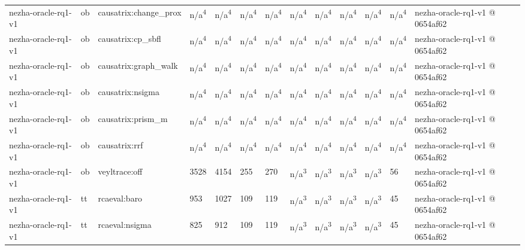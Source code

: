 \begin{table}[t]
\begin{tabular}{lllllllllllll}
nezha-oracle-rq1-v1 & ob & causatrix:change\_prox & n/a\textsuperscript{4} & n/a\textsuperscript{4} & n/a\textsuperscript{4} & n/a\textsuperscript{4} & n/a\textsuperscript{4} & n/a\textsuperscript{4} & n/a\textsuperscript{4} & n/a\textsuperscript{4} & n/a\textsuperscript{4} & nezha-oracle-rq1-v1 @ 0654af62 \\
nezha-oracle-rq1-v1 & ob & causatrix:cp\_sbfl & n/a\textsuperscript{4} & n/a\textsuperscript{4} & n/a\textsuperscript{4} & n/a\textsuperscript{4} & n/a\textsuperscript{4} & n/a\textsuperscript{4} & n/a\textsuperscript{4} & n/a\textsuperscript{4} & n/a\textsuperscript{4} & nezha-oracle-rq1-v1 @ 0654af62 \\
nezha-oracle-rq1-v1 & ob & causatrix:graph\_walk & n/a\textsuperscript{4} & n/a\textsuperscript{4} & n/a\textsuperscript{4} & n/a\textsuperscript{4} & n/a\textsuperscript{4} & n/a\textsuperscript{4} & n/a\textsuperscript{4} & n/a\textsuperscript{4} & n/a\textsuperscript{4} & nezha-oracle-rq1-v1 @ 0654af62 \\
nezha-oracle-rq1-v1 & ob & causatrix:nsigma & n/a\textsuperscript{4} & n/a\textsuperscript{4} & n/a\textsuperscript{4} & n/a\textsuperscript{4} & n/a\textsuperscript{4} & n/a\textsuperscript{4} & n/a\textsuperscript{4} & n/a\textsuperscript{4} & n/a\textsuperscript{4} & nezha-oracle-rq1-v1 @ 0654af62 \\
nezha-oracle-rq1-v1 & ob & causatrix:prism\_m & n/a\textsuperscript{4} & n/a\textsuperscript{4} & n/a\textsuperscript{4} & n/a\textsuperscript{4} & n/a\textsuperscript{4} & n/a\textsuperscript{4} & n/a\textsuperscript{4} & n/a\textsuperscript{4} & n/a\textsuperscript{4} & nezha-oracle-rq1-v1 @ 0654af62 \\
nezha-oracle-rq1-v1 & ob & causatrix:rrf & n/a\textsuperscript{4} & n/a\textsuperscript{4} & n/a\textsuperscript{4} & n/a\textsuperscript{4} & n/a\textsuperscript{4} & n/a\textsuperscript{4} & n/a\textsuperscript{4} & n/a\textsuperscript{4} & n/a\textsuperscript{4} & nezha-oracle-rq1-v1 @ 0654af62 \\
nezha-oracle-rq1-v1 & ob & veyltrace:off & 3528 & 4154 & 255 & 270 & n/a\textsuperscript{3} & n/a\textsuperscript{3} & n/a\textsuperscript{3} & n/a\textsuperscript{3} & 56 & nezha-oracle-rq1-v1 @ 0654af62 \\
nezha-oracle-rq1-v1 & tt & rcaeval:baro & 953 & 1027 & 109 & 119 & n/a\textsuperscript{3} & n/a\textsuperscript{3} & n/a\textsuperscript{3} & n/a\textsuperscript{3} & 45 & nezha-oracle-rq1-v1 @ 0654af62 \\
nezha-oracle-rq1-v1 & tt & rcaeval:nsigma & 825 & 912 & 109 & 119 & n/a\textsuperscript{3} & n/a\textsuperscript{3} & n/a\textsuperscript{3} & n/a\textsuperscript{3} & 45 & nezha-oracle-rq1-v1 @ 0654af62 \\

\end{tabular}
\end{table}
